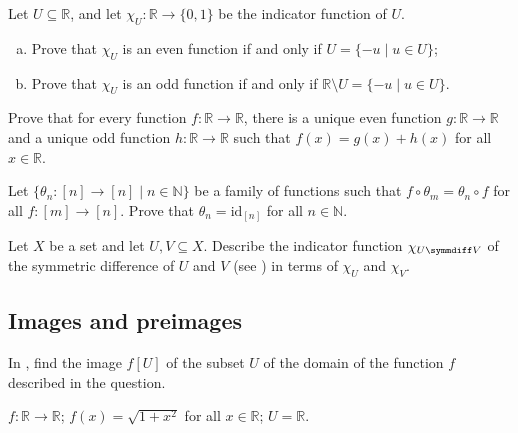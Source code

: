 \begin{chapex}
Let $U \subseteq \mathbb{R}$, and let $\chi_U : \mathbb{R} \to \{0,1\}$ be the indicator function of $U$.
\begin{enumerate}[(a)]
\item Prove that $\chi_U$ is an even function if and only if $U = \{ -u \mid u \in U \}$;
\item Prove that $\chi_U$ is an odd function if and only if $\mathbb{R} \setminus U = \{ -u \mid u \in U \}$.
\end{enumerate}
\end{chapex}

\begin{chapex}
Prove that for every function $f : \mathbb{R} \to \mathbb{R}$, there is a unique even function $g : \mathbb{R} \to \mathbb{R}$ and a unique odd function $h : \mathbb{R} \to \mathbb{R}$ such that $f(x)=g(x)+h(x)$ for all $x \in \mathbb{R}$.
\end{chapex}

\begin{chapex}
Let $\{ \theta_n : [n] \to [n] \mid n \in \mathbb{N} \}$ be a family of functions such that $f \circ \theta_m = \theta_n \circ f$ for all $f : [m] \to [n]$. Prove that $\theta_n = \mathrm{id}_{[n]}$ for all $n \in \mathbb{N}$.
\end{chapex}

\begin{chapex}
Let $X$ be a set and let $U, V \subseteq X$. Describe the indicator function $\chi_{U \symmdiff V}$ of the symmetric difference of $U$ and $V$ (see ) in terms of $\chi_U$ and $\chi_V$.
\end{chapex}

\subsection*{Images and preimages}

In , find the image $f[U]$ of the subset $U$ of the domain of the function $f$ described in the question.

\begin{chapex}
\label{cqComputeImageBegin}
$f : \mathbb{R} \to \mathbb{R}$; $f(x) = \sqrt{1+x^2}$ for all $x \in \mathbb{R}$; $U = \mathbb{R}$.
\end{chapex}

